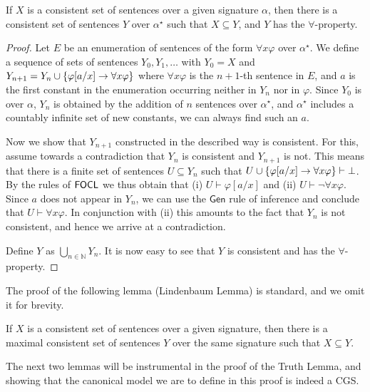 \documentclass[sigconf,anonymous]{aamas}
\begin{document}
\begin{lemma}
\label{lemma:expConst}
    If $X$ is a consistent set of sentences over a given signature $\alpha$, then there is a consistent set of sentences $Y$ over $\alpha^\star$ such that $X\subseteq Y$, and $Y$ has the $\forall$-property.  
\end{lemma}
\begin{proof}
    Let $E$ be an enumeration of sentences of the form $\forall x \varphi$ over $\alpha^\star$. We define a sequence of sets of sentences $Y_0,Y_1,\ldots$ with $Y_0=X$ and $Y_{n+1}=Y_n \cup \{ \varphi[a/x]\to \forall x \varphi\}$ where $\forall x \varphi$ is the $n+1$-th sentence in $E$, and $a$ is the first constant in the enumeration occurring neither in $Y_n$ nor in $\varphi$. Since $Y_0$ is over $\alpha$, $Y_n$ is obtained by the addition of $n$ sentences over $\alpha^\star$, and $\alpha^\star$ includes a countably infinite set of new constants, we can always find such an $a$. 
    
    Now we show that $Y_{n+1}$ constructed in the described way is consistent. For this, assume towards a contradiction that $Y_n$ is consistent and $Y_{n+1}$ is not. This means that there is a finite set of sentences $U\subseteq Y_n$ such that $U\cup \{\varphi [a/x]\to \forall x \varphi\}\vdash \bot$. By the rules of $\mathsf{FOCL}$ we thus obtain that (i) $U\vdash \varphi [a/x]$ and (ii) $U\vdash \neg \forall x \varphi$. Since $a$ does not appear in $Y_n$, we can use the  $\mathsf{Gen}$ rule of inference and conclude that $U\vdash \forall x \varphi$. In conjunction with (ii) this amounts to the fact that $Y_n$ is not consistent, and hence we arrive at a contradiction.
    
    Define $Y$ as $\bigcup_{n\in \mathbb{N} }Y_n$. It is now easy to see that $Y$ is consistent and has the $\forall$-property. 
\end{proof}

The proof of the following lemma (Lindenbaum Lemma) is standard, and we omit it for brevity.


\begin{lemma}
\label{lemma:mcs}
    If $X$ is a consistent set of sentences over a given signature, then there is a maximal consistent set of sentences $Y$ over the same signature such that $X\subseteq Y$.
\end{lemma}

The next two lemmas will be instrumental in the proof of the Truth Lemma, and showing that the canonical model we are to define in this proof is indeed a CGS. 
\end{document}
